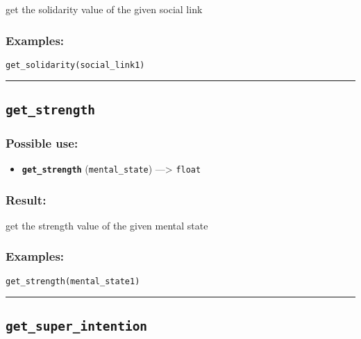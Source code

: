 \documentclass[]{book}
\providecommand{\tightlist}{%
  \setlength{\itemsep}{0pt}\setlength{\parskip}{0pt}}
\theoremstyle{definition}
\theoremstyle{definition}
\theoremstyle{definition}
\theoremstyle{remark}
\begin{document}
get the solidarity value of the given social link

\subsubsection{Examples:}\label{examples-174}

\begin{verbatim}
get_solidarity(social_link1) 
\end{verbatim}

\begin{center}\rule{0.5\linewidth}{\linethickness}\end{center}

\subsection{\texorpdfstring{\texttt{get\_strength}}{get\_strength}}\label{get_strength}

\subsubsection{Possible use:}\label{possible-use-228}

\begin{itemize}
\tightlist
\item
  \textbf{\texttt{get\_strength}} (\texttt{mental\_state})
  ---\textgreater{} \texttt{float}
\end{itemize}

\subsubsection{Result:}\label{result-222}

get the strength value of the given mental state

\subsubsection{Examples:}\label{examples-175}

\begin{verbatim}
get_strength(mental_state1) 
\end{verbatim}

\begin{center}\rule{0.5\linewidth}{\linethickness}\end{center}

\subsection{\texorpdfstring{\texttt{get\_super\_intention}}{get\_super\_intention}}\label{get_super_intention}
\end{document}

